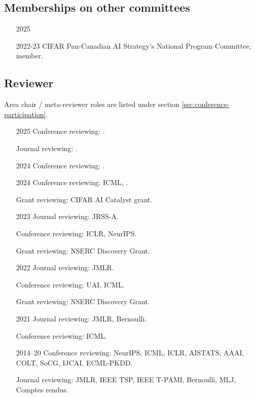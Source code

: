 \documentclass[10pt]{article}
\begin{document}
\subsection{Memberships on other committees} %
\begin{itemize}[leftmargin=5em]
\item[2025] 
\item[2022-23] {CIFAR Pan-Canadian AI Strategy's National Program Committee, member.}
\end{itemize}

%

\subsection{Reviewer} \label{sec:reviewer} %

Area chair / meta-reviewer roles are listed under section \ref{sec:conference-participation}.

\begin{itemize}[leftmargin=5em]
  \item[2025] Conference reviewing: .
  \item[] Journal reviewing: .
  \item[2024] Conference reviewing: .
  \item[2024] Conference reviewing: ICML, .
  \item[] Grant reviewing: CIFAR AI Catalyst grant.
  \item[2023] Journal reviewing: {JRSS-A}.
  \item[    ] Conference reviewing: {ICLR, NeurIPS}.
  \item[] Grant reviewing: NSERC Discovery Grant.
  \item[2022] Journal reviewing: {JMLR}.
  \item[    ] Conference reviewing: {UAI}, {ICML}.
  \item[    ] Grant reviewing: NSERC Discovery Grant.
  \item[2021] Journal reviewing: {JMLR}, {Bernoulli}.
  \item[] Conference reviewing: ICML.
  \item[2014--20] Conference reviewing: NeurIPS, ICML, ICLR, AISTATS, AAAI, COLT, SoCG, IJCAI, ECML-PKDD.
  \item[] Journal reviewing: JMLR, IEEE TSP, IEEE T-PAMI, Bernoulli, MLJ, Comptes rendus.
\end{itemize}
\end{document}
